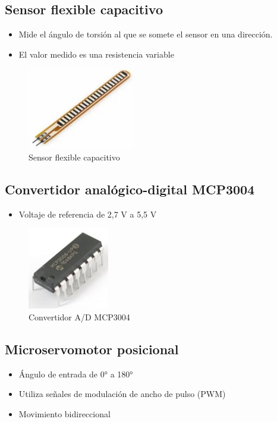 \documentclass[12pt, twoside]{report}
\begin{document}
\subsection*{Sensor flexible capacitivo}
\begin{itemize}
	\item Mide el ángulo de torsión al que se somete el sensor en una dirección.
	\item El valor medido es una resistencia variable
\end{itemize}

\begin{figure}[htb]
	\centering
	\includegraphics[scale=0.6]{flexsensor.jpg}
	\caption{Sensor flexible capacitivo}
\end{figure}

\subsection*{Convertidor analógico-digital MCP3004}
\begin{itemize}
	\item Voltaje de referencia de 2,7 V a 5,5 V
\end{itemize}

\begin{figure}[htb]
	\centering
	\includegraphics[scale=0.6]{mcp3004.jpg}
	\caption{Convertidor A/D MCP3004}
\end{figure}

\subsection*{Microservomotor posicional}
\begin{itemize}
	\item Ángulo de entrada de 0° a 180°
	\item Utiliza señales de modulación de ancho de pulso (PWM)
	\item Movimiento bidireccional
\end{itemize}
\end{document}
